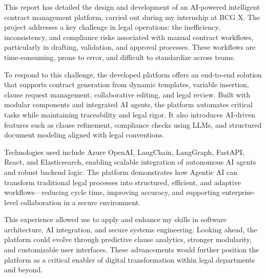 This report has detailed the design and development of an AI-powered intelligent contract management platform, carried out during my internship at BCG X. The project addresses a key challenge in legal operations: the inefficiency, inconsistency, and compliance risks associated with manual contract workflows, particularly in drafting, validation, and approval processes. These workflows are time-consuming, prone to error, and difficult to standardize across teams.\mynewline

To respond to this challenge, the developed platform offers an end-to-end solution that supports contract generation from dynamic templates, variable insertion, clause request management, collaborative editing, and legal review. Built with modular components and integrated AI agents, the platform automates critical tasks while maintaining traceability and legal rigor. It also introduces AI-driven features such as clause refinement, compliance checks using LLMs, and structured document modeling aligned with legal conventions.\mynewline

Technologies used include Azure OpenAI, LangChain, LangGraph, FastAPI, React, and Elasticsearch, enabling scalable integration of autonomous AI agents and robust backend logic. The platform demonstrates how Agentic AI can transform traditional legal processes into structured, efficient, and adaptive workflows—reducing cycle time, improving accuracy, and supporting enterprise-level collaboration in a secure environment.\mynewline

This experience allowed me to apply and enhance my skills in software architecture, AI integration, and secure systems engineering. Looking ahead, the platform could evolve through predictive clause analytics, stronger modularity, and customizable user interfaces. These advancements would further position the platform as a critical enabler of digital transformation within legal departments and beyond.